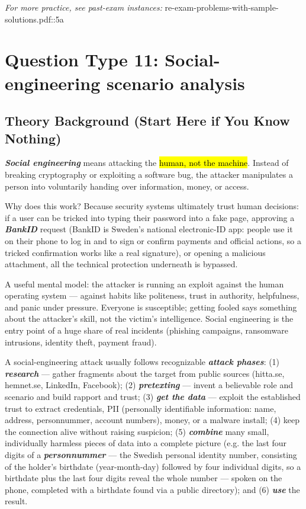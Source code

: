 \documentclass[12pt, a4paper]{article}
\newcommand{\term}[1]{\textbf{\textit{#1}}}        %
\newcommand{\imp}[1]{\hl{#1}}                       %
\begin{document}
\textit{For more practice, see past-exam instances:} re-exam-problems-with-sample-solutions.pdf::5a

\section{Question Type 11: Social-engineering scenario analysis}

\subsection*{Theory Background (Start Here if You Know Nothing)}

\term{Social engineering} means attacking the \imp{human, not the machine}. Instead of breaking cryptography or exploiting a software bug, the attacker manipulates a person into voluntarily handing over information, money, or access.

Why does this work? Because security systems ultimately trust human decisions: if a user can be tricked into typing their password into a fake page, approving a \term{BankID} request (BankID is Sweden's national electronic-ID app: people use it on their phone to log in and to sign or confirm payments and official actions, so a tricked confirmation works like a real signature), or opening a malicious attachment, all the technical protection underneath is bypassed.

A useful mental model: the attacker is running an exploit against the human operating system --- against habits like politeness, trust in authority, helpfulness, and panic under pressure.
Everyone is susceptible; getting fooled says something about the attacker's skill, not the victim's intelligence.
Social engineering is the entry point of a huge share of real incidents (phishing campaigns, ransomware intrusions, identity theft, payment fraud).

A social-engineering attack usually follows recognizable \term{attack phases}: (1) \term{research} --- gather fragments about the target from public sources (hitta.se, hemnet.se, LinkedIn, Facebook); (2) \term{pretexting} --- invent a believable role and scenario and build rapport and trust; (3) \term{get the data} --- exploit the established trust to extract credentials, PII (personally identifiable information: name, address, personnummer, account numbers), money, or a malware install; (4) keep the connection alive without raising suspicion; (5) \term{combine} many small, individually harmless pieces of data into a complete picture (e.g. the last four digits of a \term{personnummer} --- the Swedish personal identity number, consisting of the holder's birthdate (year-month-day) followed by four individual digits, so a birthdate plus the last four digits reveal the whole number --- spoken on the phone, completed with a birthdate found via a public directory); and (6) \term{use} the result.
\end{document}
